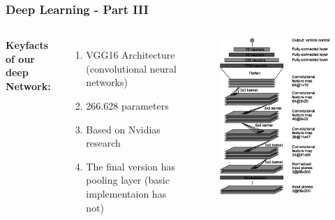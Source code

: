 \documentclass{beamer}
\begin{document}
%
%
\begin{frame}
\frametitle{Deep Learning - Part III}
\begin{columns}[c] %
\textbf{Keyfacts of our deep Network: }
\begin{enumerate}
\item VGG16 Architecture (convolutional neural networks)
\item 266.628 parameters
\item Based on Nvidias research 
\item The final version has pooling layer (basic implementaion has not)
\end{enumerate}
\begin{figure}
\includegraphics[width=0.75\linewidth]{photo/CNNArchitecture.png}
\end{figure}
\end{columns}
\end{frame}
%
%
\end{document}
